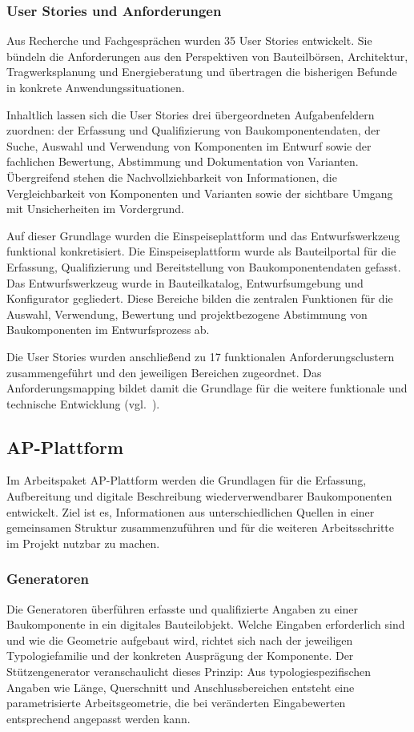 \documentclass[type=zwischenbericht,theme=dark]{zukunftbau}
\begin{document}
\subsubsection{User Stories und Anforderungen}
Aus Recherche und Fachgesprächen wurden 35 User Stories entwickelt. Sie bündeln die Anforderungen aus den Perspektiven von Bauteilbörsen, Architektur, Tragwerksplanung und Energieberatung und übertragen die bisherigen Befunde in konkrete Anwendungssituationen.

Inhaltlich lassen sich die User Stories drei übergeordneten Aufgabenfeldern zuordnen: der Erfassung und Qualifizierung von Baukomponentendaten, der Suche, Auswahl und Verwendung von Komponenten im Entwurf sowie der fachlichen Bewertung, Abstimmung und Dokumentation von Varianten. Übergreifend stehen die Nachvollziehbarkeit von Informationen, die Vergleichbarkeit von Komponenten und Varianten sowie der sichtbare Umgang mit Unsicherheiten im Vordergrund.

Auf dieser Grundlage wurden die Einspeiseplattform und das Entwurfswerkzeug funktional konkretisiert. Die Einspeiseplattform wurde als Bauteilportal für die Erfassung, Qualifizierung und Bereitstellung von Baukomponentendaten gefasst. Das Entwurfswerkzeug wurde in Bauteilkatalog, Entwurfsumgebung und Konfigurator gegliedert. Diese Bereiche bilden die zentralen Funktionen für die Auswahl, Verwendung, Bewertung und projektbezogene Abstimmung von Baukomponenten im Entwurfsprozess ab.

Die User Stories wurden anschließend zu 17 funktionalen Anforderungsclustern zusammengeführt und den jeweiligen Bereichen zugeordnet. Das Anforderungsmapping bildet damit die Grundlage für die weitere funktionale und technische Entwicklung (vgl.\ ).

\subsection{AP-Plattform}

Im Arbeitspaket AP-Plattform werden die Grundlagen für die Erfassung, Aufbereitung und digitale Beschreibung wiederverwendbarer Baukomponenten entwickelt. Ziel ist es, Informationen aus unterschiedlichen Quellen in einer gemeinsamen Struktur zusammenzuführen und für die weiteren Arbeitsschritte im Projekt nutzbar zu machen.

\subsubsection{Generatoren}
Die Generatoren überführen erfasste und qualifizierte Angaben zu einer Baukomponente in ein digitales Bauteilobjekt. Welche Eingaben erforderlich sind und wie die Geometrie aufgebaut wird, richtet sich nach der jeweiligen Typologiefamilie und der konkreten Ausprägung der Komponente. Der Stützengenerator veranschaulicht dieses Prinzip: Aus typologiespezifischen Angaben wie Länge, Querschnitt und Anschlussbereichen entsteht eine parametrisierte Arbeitsgeometrie, die bei veränderten Eingabewerten entsprechend angepasst werden kann.
\end{document}
